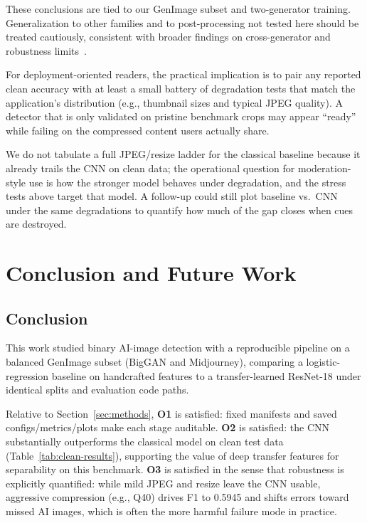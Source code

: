 \documentclass[conference]{IEEEtran}
\begin{document}
These conclusions are tied to our GenImage subset and two-generator training. Generalization to other families and to post-processing not tested here should be treated cautiously, consistent with broader findings on cross-generator and robustness limits~\cite{zhu2023genimage,ojha2023universal,chai2020makes}.

For deployment-oriented readers, the practical implication is to pair any reported clean accuracy with at least a small battery of degradation tests that match the application's distribution (e.g., thumbnail sizes and typical JPEG quality). A detector that is only validated on pristine benchmark crops may appear ``ready'' while failing on the compressed content users actually share.

We do not tabulate a full JPEG/resize ladder for the classical baseline because it already trails the CNN on clean data; the operational question for moderation-style use is how the stronger model behaves under degradation, and the stress tests above target that model. A follow-up could still plot baseline vs.\ CNN under the same degradations to quantify how much of the gap closes when cues are destroyed.

\section{Conclusion and Future Work}
\subsection{Conclusion}
This work studied binary AI-image detection with a reproducible pipeline on a balanced GenImage subset (BigGAN and Midjourney), comparing a logistic-regression baseline on handcrafted features to a transfer-learned ResNet-18 under identical splits and evaluation code paths.

Relative to Section~\ref{sec:methods}, \textbf{O1} is satisfied: fixed manifests and saved configs/metrics/plots make each stage auditable. \textbf{O2} is satisfied: the CNN substantially outperforms the classical model on clean test data (Table~\ref{tab:clean-results}), supporting the value of deep transfer features for separability on this benchmark. \textbf{O3} is satisfied in the sense that robustness is explicitly quantified: while mild JPEG and resize leave the CNN usable, aggressive compression (e.g., Q40) drives F1 to 0.5945 and shifts errors toward missed AI images, which is often the more harmful failure mode in practice.
\end{document}
